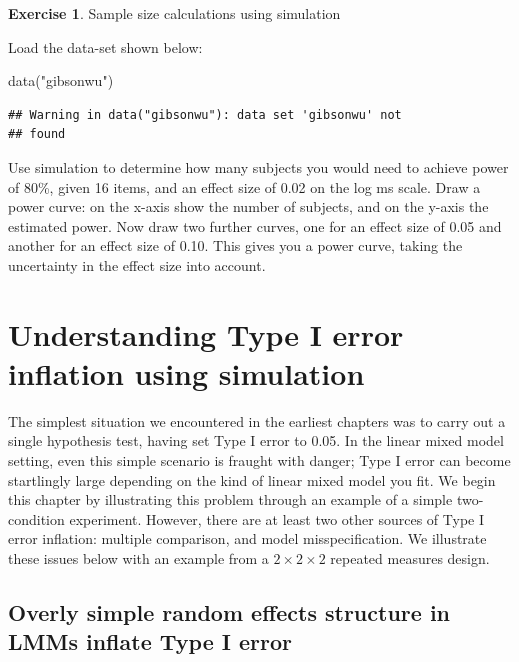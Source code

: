 \documentclass[
  12pt,
]{krantz}
\newenvironment{Shaded}{\begin{snugshade}}{\end{snugshade}}
\newcommand{\FunctionTok}[1]{\textcolor[rgb]{0.00,0.00,0.00}{#1}}
\newcommand{\NormalTok}[1]{#1}
\newcommand{\StringTok}[1]{\textcolor[rgb]{0.31,0.60,0.02}{#1}}
\theoremstyle{definition}
\theoremstyle{definition}
\theoremstyle{definition}
\newtheorem{exercise}{Exercise}[chapter]
\theoremstyle{definition}
\theoremstyle{remark}
\begin{document}
\begin{exercise}
\protect\hypertarget{exr:SimulationexercisesPart5}{}\label{exr:SimulationexercisesPart5}Sample size calculations using simulation
\end{exercise}

Load the data-set shown below:

\begin{Shaded}
\begin{Highlighting}[]
\FunctionTok{data}\NormalTok{(}\StringTok{"gibsonwu"}\NormalTok{)}
\end{Highlighting}
\end{Shaded}

\begin{verbatim}
## Warning in data("gibsonwu"): data set 'gibsonwu' not
## found
\end{verbatim}

Use simulation to determine how many subjects you would need to achieve power of 80\%, given 16 items, and an effect size of 0.02 on the log ms scale. Draw a power curve: on the x-axis show the number of subjects, and on the y-axis the estimated power. Now draw two further curves, one for an effect size of 0.05 and another for an effect size of 0.10. This gives you a power curve, taking the uncertainty in the effect size into account.

\hypertarget{ch:MultComp}{%
\chapter{Understanding Type I error inflation using simulation}\label{ch:MultComp}}

The simplest situation we encountered in the earliest chapters was to carry out a single hypothesis test, having set Type I error to 0.05. In the linear mixed model setting, even this simple scenario is fraught with danger; Type I error can become startlingly large depending on the kind of linear mixed model you fit. We begin this chapter by illustrating this problem through an example of a simple two-condition experiment. However, there are at least two other sources of Type I error inflation: multiple comparison, and model misspecification. We illustrate these issues below with an example from a \(2\times 2\times 2\) repeated measures design.

\hypertarget{overly-simple-random-effects-structure-in-lmms-inflate-type-i-error}{%
\section{Overly simple random effects structure in LMMs inflate Type I error}\label{overly-simple-random-effects-structure-in-lmms-inflate-type-i-error}}
\end{document}
